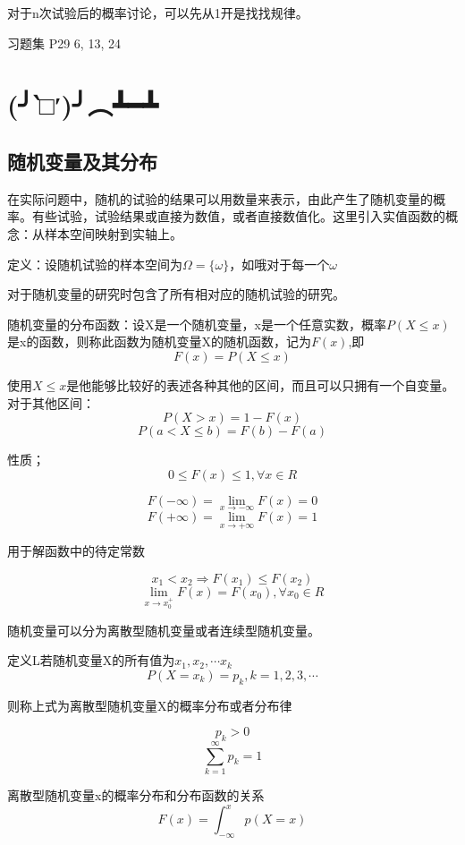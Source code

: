 \documentclass[10pt, a4paper]{article}
\begin{document}
            对于n次试验后的概率讨论，可以先从1开是找找规律。

            习题集 P29 6, 13, 24

    \section{(╯‵□′)╯︵┻━┻}
        \subsection{随机变量及其分布}
            在实际问题中，随机的试验的结果可以用数量来表示，由此产生了随机变量的概率。有些试验，试验结果或直接为数值，或者直接数值化。这里引入实值函数的概念：从样本空间映射到实轴上。

            定义：设随机试验的样本空间为$\Omega = \{\omega\}$，如哦对于每一个$\omega$
            
            对于随机变量的研究时包含了所有相对应的随机试验的研究。

            随机变量的分布函数：设X是一个随机变量，x是一个任意实数，概率$P(X \leqslant x)$是x的函数，则称此函数为随机变量X的随机函数，记为$F(x)$,即
            $$F(x) = P(X \leqslant x)$$

            使用$X \leqslant x$是他能够比较好的表述各种其他的区间，而且可以只拥有一个自变量。对于其他区间：
            $$P(X > x) = 1 - F(x)$$
            $$P(a < X \leqslant b) = F(b) - F(a)$$

            性质；
            $$0 \leqslant F(x) \leqslant 1, \forall x \in R$$

            $$F(-\infty) = \lim_{x \to -\infty}F(x) = 0$$
            $$F(+\infty) = \lim_{x \to +\infty}F(x) = 1$$
            
            用于解函数中的待定常数

            $$x_1 < x_2 \Rightarrow F(x_1) \leqslant F(x_2)$$
            $$\lim_{x \to x_0^{+}}F(x) = F(x_0), \forall x_0 \in R$$

            随机变量可以分为离散型随机变量或者连续型随机变量。

            定义L若随机变量X的所有值为$x_1, x_2, \cdots x_k$
            $$P(X = x_k) = p_k, k = 1, 2, 3, \cdots$$

            \indent 则称上式为离散型随机变量X的概率分布或者分布律

            $$p_k > 0$$
            $$\sum_{k = 1}^{\infty}p_k = 1$$

            离散型随机变量x的概率分布和分布函数的关系
            $$F(x) = \int_{-\infty}^{x}p(X = x)$$
\end{document}
